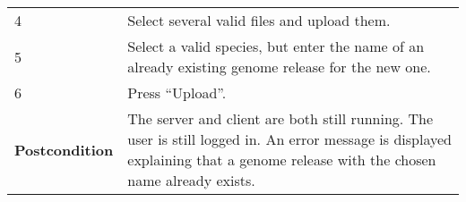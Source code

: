 \begin{longtable}[c]{@{}ll@{}}
\begin{minipage}[t]{0.31\columnwidth}\raggedright\strut
4
\strut\end{minipage} &
\begin{minipage}[t]{0.63\columnwidth}\raggedright\strut
Select several valid files and upload them.
\strut\end{minipage}\tabularnewline
\begin{minipage}[t]{0.31\columnwidth}\raggedright\strut
5
\strut\end{minipage} &
\begin{minipage}[t]{0.63\columnwidth}\raggedright\strut
Select a valid species, but enter the name of an already existing genome
release for the new one.
\strut\end{minipage}\tabularnewline
\begin{minipage}[t]{0.31\columnwidth}\raggedright\strut
6
\strut\end{minipage} &
\begin{minipage}[t]{0.63\columnwidth}\raggedright\strut
Press ``Upload''.
\strut\end{minipage}\tabularnewline
\begin{minipage}[t]{0.31\columnwidth}\raggedright\strut
\textbf{Postcondition}
\strut\end{minipage} &
\begin{minipage}[t]{0.63\columnwidth}\raggedright\strut
The server and client are both still running. The user is still logged
in. An error message is displayed explaining that a genome release with
the chosen name already exists.
\strut\end{minipage}\tabularnewline
\bottomrule
\end{longtable}

